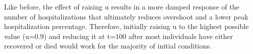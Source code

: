 \documentclass[fleqn]{article}
\begin{document}
Like before, the effect of raising u results in a more damped response of the number of hospitalizations that ultimately reduces overshoot and a lower peak hospitalization percentage. Therefore, initially raising u to the highest possible value (u=0.9) and reducing it at t=100 after most individuals have either recovered or died would work for the majority of initial conditions.
\end{document}
